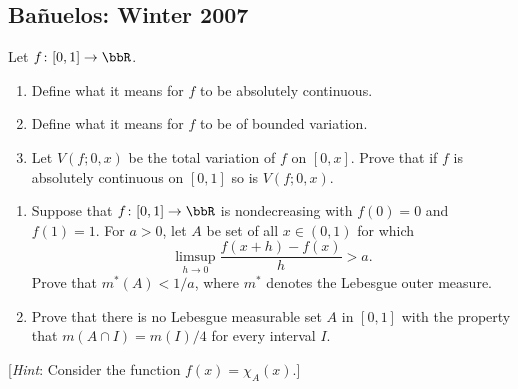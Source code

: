\subsection{Bañuelos: Winter 2007}
\begin{problem}
  Let $f\colon[0,1]\to\bbR$.
  \begin{enumerate}[label=(\roman*),noitemsep]
  \item Define what it means for $f$ to be absolutely continuous.
  \item Define what it means for $f$ to be of bounded variation.
  \item Let $V(f;0,x)$ be the total variation of $f$ on $[0,x]$. Prove that
    if $f$ is absolutely continuous on $[0,1]$ so is $V(f;0,x)$.
  \end{enumerate}
\end{problem}
\begin{solution}
\end{solution}

\begin{problem}
  \hfill
  \begin{enumerate}[label=(\roman*),noitemsep]
  \item Suppose that $f\colon[0,1]\to\bbR$ is nondecreasing with $f(0)=0$
    and $f(1)=1$. For $a>0$, let $A$ be set of all $x\in(0,1)$ for which
    \[
      \limsup_{h\to 0}\frac{f(x+h)-f(x)}{h}>a.
    \]
    Prove that $m^*(A)<1/a$, where $m^*$ denotes the Lebesgue outer
    measure.
  \item Prove that there is no Lebesgue measurable set $A$ in $[0,1]$ with
    the property that $m(A\cap I)=m(I)/4$ for every interval $I$.
  \end{enumerate}
  [\emph{Hint}: Consider the function $f(x)=\chi_A(x)$.]
\end{problem}
\begin{solution}
\end{solution}

\begin{problem}
\end{problem}
\begin{solution}
\end{solution}

\begin{problem}
\end{problem}
\begin{solution}
\end{solution}

\begin{problem}
\end{problem}
\begin{solution}
\end{solution}

\begin{problem}
\end{problem}
\begin{solution}
\end{solution}

